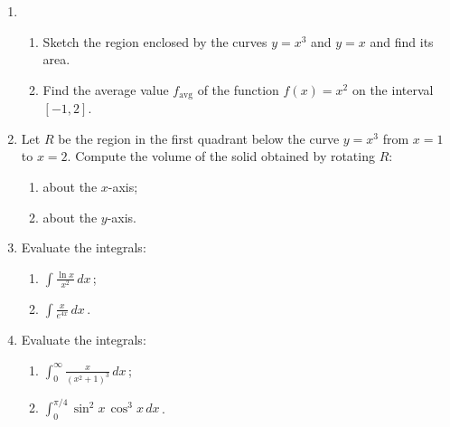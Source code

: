 \documentclass[10pt]{article}
\begin{document}
\begin{enumerate}

\item 
\begin{enumerate}
\item Sketch the region enclosed by the curves $y=x^3$ and $y=x$ and find its area.

\item Find the average value $f_{\mathrm{avg}}$ of the function $f(x)=x^2$ on the interval $[-1,2]$.

\end{enumerate}

\item Let $R$ be the region in the first quadrant below the curve $y=x^3$ from $x=1$ to $x=2$. Compute the volume of the solid obtained by rotating $R$:
\begin{multicols}{2}
\begin{enumerate}

\item about the $x$-axis;

\item about the $y$-axis.

\end{enumerate}
\end{multicols}

\item Evaluate the integrals:

\begin{multicols}{2}
\begin{enumerate}

\item $ \displaystyle\int\frac{\ln x}{x^2}\,dx$\,;

\item $\displaystyle\int\frac{x}{e^{4x}}\,dx$\,.

\end{enumerate}
\end{multicols}

\item Evaluate the integrals:

\begin{multicols}{2}
\begin{enumerate}

\item $ \displaystyle\int_0^{\infty}\frac{x}{(x^2+1)^3}\,dx$\,;
 
\item $\displaystyle\int_{0}^{\pi/4}{\sin^2x\,\cos^3x\,dx}$\,.


\end{enumerate}
\end{multicols}
\end{enumerate}
\end{document}
